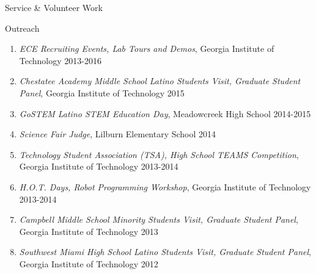 \documentclass{resume} %
\newcommand{\sectionspace}{\vspace{3mm}}
\newcommand{\simplelistentry}[3]{\textit{#1}, {#2} \hfill {#3}}
\begin{document}
\begin{rSection}{Service \& Volunteer Work}
\begin{rSubsection}{Outreach}{}{}{}
\begin{enumerate}
\item \simplelistentry{ECE Recruiting Events, Lab Tours and Demos}{Georgia
    Institute of Technology}{2013-2016}

\item \simplelistentry{Chestatee Academy Middle School Latino Students Visit,
    Graduate Student Panel}{Georgia Institute of Technology}{2015}

\item \simplelistentry{GoSTEM Latino STEM Education Day}{Meadowcreek High
    School}{2014-2015}

\item \simplelistentry{Science Fair Judge}{Lilburn Elementary School}{2014}

\item \simplelistentry{Technology Student Association (TSA), High School TEAMS
    Competition}{Georgia Institute of Technology}{2013-2014}

\item \simplelistentry{H.O.T. Days, Robot Programming Workshop}{Georgia
    Institute of Technology}{2013-2014}

\item \simplelistentry{Campbell Middle School Minority Students Visit, Graduate
    Student Panel}{Georgia Institute of Technology}{2013}

\item \simplelistentry{Southwest Miami High School Latino Students Visit,
    Graduate Student Panel}{Georgia Institute of Technology}{2012}

\end{enumerate}
\end{rSubsection}

\end{rSection}





\iffalse
\sectionspace
\begin{rSection}{References}
Available upon request.
\end{rSection}
\fi


\end{document}
